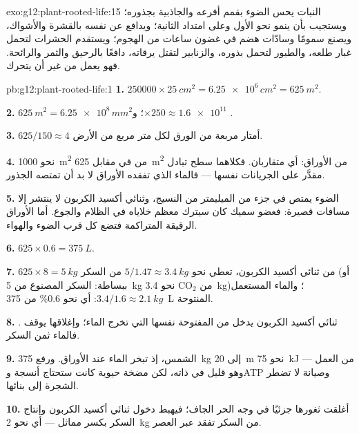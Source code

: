 \begin{solution}{exo:g12:plant-rooted-life:15}
النبات يحس الضوء بقمم أفرعه والجاذبية بجذوره؛ ويستجيب بأن ينمو نحو
الأول وعلى امتداد الثانية؛ ويدافع عن نفسه بالقشرة والأشواك، ويصنع
سمومًا وسادّات هضم في غضون ساعات من الهجوم؛ ويستقدم الحشرات لتحمل
غبار طلعه، والطيور لتحمل بذوره، والزنابير لتقتل يرقاته، دافعًا بالرحيق
والثمر والرائحة. فهو يعمل من غير أن يتحرك.
\end{solution}

\begin{solution}{pb:g12:plant-rooted-life:1}
\textbf{1.} $\num{250000} \times \qty{25}{cm^2} = \num{6.25e6}\,
\unit{cm^2} = \qty{625}{m^2}$.

\textbf{2.} $\qty{625}{m^2} = \num{6.25e8}\,\unit{mm^2}$؛ و$\times 250
\approx \num{1.6e11}$ .

\textbf{3.} $625/150 \approx 4$ أمتار مربعة من الورق لكل متر مربع من
الأرض.

\textbf{4.} نحو \qty{1000}{m^2} من  في مقابل
\qty{625}{m^2} من الأوراق: أي متقاربان. فكلاهما سطح تبادل مقدَّر على
الجريانات نفسها --- فالماء الذي تفقده الأوراق لا بد أن تمتصه الجذور.

\textbf{5.} الضوء يمتص في جزء من الميليمتر من النسيج، وثنائي أكسيد
الكربون لا ينتشر إلا مسافات قصيرة: فعضو سميك كان سيترك معظم خلاياه في
الظلام والجوع. أما الأوراق الرقيقة المتراكمة فتضع كل  قرب الضوء
والهواء.

\textbf{6.} $625 \times 0.6 = \qty{375}{L}$.

\textbf{7.} $625 \times 8 = \qty{5}{kg}$ من ثنائي أكسيد الكربون،
تعطي نحو $5/1.47 \approx \qty{3.4}{kg}$ من السكر (أو ببساطة: السكر
المصنوع من \qty{5}{kg} من $\mathrm{CO_2}$ نحو \qty{3.4}{kg})؛
والماء المستعمل $3.4/1.6 \approx \qty{2.1}{kg}$: أي نحو 0.6\% من
\qty{375}{L} المنتوحة.

\textbf{8.} ثنائي أكسيد الكربون يدخل من  المفتوحة نفسها التي
تخرج الماء؛ وإغلاقها يوقف . فالماء ثمن السكر.

\textbf{9.} الشمس، إذ تبخر الماء عند الأوراق. ورفع \qty{375}{kg} إلى
\qty{20}{m} نحو \qty{75}{kJ} من العمل --- وهو قليل في ذاته، لكن مضخة
حيوية كانت ستحتاج أنسجة وATP وصيانة لا تضطر الشجرة إلى بنائها.

\textbf{10.} أغلقت ثغورها جزئيًا في وجه الحر الجاف؛ فيهبط دخول ثنائي
أكسيد الكربون وإنتاج السكر بكسر مماثل --- أي نحو \qty{2}{kg} من السكر
تفقد عبر العصر.


\end{solution}
